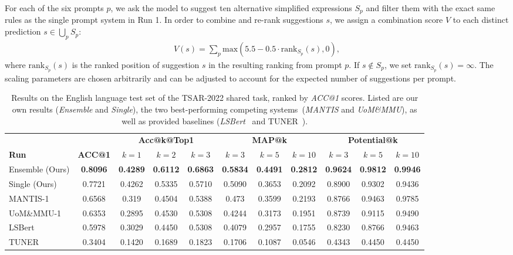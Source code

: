 \documentclass[11pt]{article}
\begin{document}
For each of the six prompts $p$, we ask the model to suggest ten alternative simplified expressions $S_p$ and filter them with the exact same rules as the single prompt system in Run 1. In order to combine and re-rank suggestions $s$, we assign a combination score $V$ to each distinct prediction $s \in \bigcup_p S_p$:
\begin{align}
	V(s) = \sum_p \text{max}(5.5 - 0.5 \cdot \text{rank}_{S_p}(s), 0),
\end{align}
where $\text{rank}_{S_p}(s)$ is the ranked position of suggestion $s$ in the resulting ranking from prompt $p$. If $s \notin S_p$, we set $\text{rank}_{S_p}(s) = \infty$. The scaling parameters are chosen arbitrarily and can be adjusted to account for the expected number of suggestions per prompt.



\begin{table*}
	\hspace*{-0.35cm}
	\setlength{\tabcolsep}{4pt}
\centering
\begin{tabular}{l|c|ccc|ccc|ccc}
 	&       & \multicolumn{3}{|c|}{\textbf{Acc@k@Top1}} & \multicolumn{3}{c|}{\textbf{MAP@k}} & \multicolumn{3}{c}{\textbf{Potential@k}}\\
\textbf{Run} & \textbf{ACC@1} & $k=1$ & $k=2$ & $k=3$ & $k=3$ & $k=5$ & $k=10$ & $k=3$ & $k=5$ & $k=10$\\
\hline
Ensemble (Ours) & \textbf{0.8096} & \textbf{0.4289} & \textbf{0.6112} & \textbf{0.6863} & \textbf{0.5834} & \textbf{0.4491} & \textbf{0.2812} & \textbf{0.9624} & \textbf{0.9812} & \textbf{0.9946}\\
Single (Ours) & 0.7721 & 0.4262 & 0.5335 & 0.5710 & 0.5090 & 0.3653 & 0.2092 & 0.8900 & 0.9302 & 0.9436\\
\hline
MANTIS-1 & 0.6568 & 0.319 & 0.4504 & 0.5388 & 0.473 & 0.3599 & 0.2193 & 0.8766 & 0.9463 & 0.9785\\
UoM\&MMU-1 & 0.6353 & 0.2895 & 0.4530 & 0.5308 & 0.4244 & 0.3173 & 0.1951 & 0.8739 & 0.9115 & 0.9490\\
LSBert & 0.5978 & 0.3029 & 0.4450 & 0.5308 & 0.4079 & 0.2957 & 0.1755 & 0.8230 & 0.8766 & 0.9463 \\
TUNER & 0.3404 & 0.1420 & 0.1689 & 0.1823 & 0.1706 & 0.1087 & 0.0546 & 0.4343 & 0.4450 & 0.4450 \\
\end{tabular}
\caption{Results on the English language test set of the TSAR-2022 shared task, ranked by \emph{ACC@1} scores. Listed are our own results (\emph{Ensemble} and  \emph{Single}), the two best-performing competing systems~(\emph{MANTIS} and \emph{UoM\&MMU}), as well as provided baselines (\emph{LSBert}~\cite{qiang-etal-2020-lexical} and TUNER~\cite{ferres-etal-2017-adaptable}).}
\label{tab:english}
\end{table*}
\end{document}
